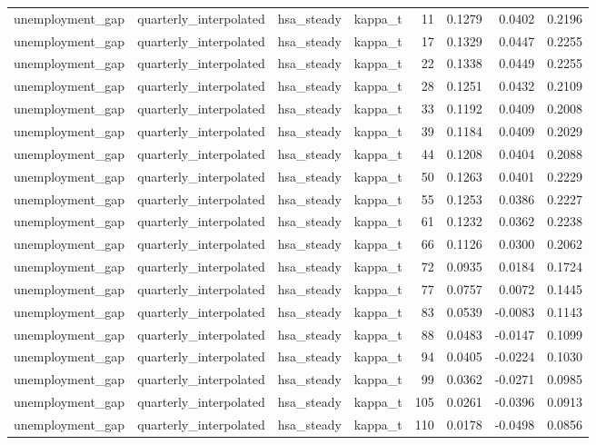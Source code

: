 \begin{tabular}{llllrrrr}
unemployment\_gap & quarterly\_interpolated & hsa\_steady & kappa\_t & 11 & 0.1279 & 0.0402 & 0.2196 \\
unemployment\_gap & quarterly\_interpolated & hsa\_steady & kappa\_t & 17 & 0.1329 & 0.0447 & 0.2255 \\
unemployment\_gap & quarterly\_interpolated & hsa\_steady & kappa\_t & 22 & 0.1338 & 0.0449 & 0.2255 \\
unemployment\_gap & quarterly\_interpolated & hsa\_steady & kappa\_t & 28 & 0.1251 & 0.0432 & 0.2109 \\
unemployment\_gap & quarterly\_interpolated & hsa\_steady & kappa\_t & 33 & 0.1192 & 0.0409 & 0.2008 \\
unemployment\_gap & quarterly\_interpolated & hsa\_steady & kappa\_t & 39 & 0.1184 & 0.0409 & 0.2029 \\
unemployment\_gap & quarterly\_interpolated & hsa\_steady & kappa\_t & 44 & 0.1208 & 0.0404 & 0.2088 \\
unemployment\_gap & quarterly\_interpolated & hsa\_steady & kappa\_t & 50 & 0.1263 & 0.0401 & 0.2229 \\
unemployment\_gap & quarterly\_interpolated & hsa\_steady & kappa\_t & 55 & 0.1253 & 0.0386 & 0.2227 \\
unemployment\_gap & quarterly\_interpolated & hsa\_steady & kappa\_t & 61 & 0.1232 & 0.0362 & 0.2238 \\
unemployment\_gap & quarterly\_interpolated & hsa\_steady & kappa\_t & 66 & 0.1126 & 0.0300 & 0.2062 \\
unemployment\_gap & quarterly\_interpolated & hsa\_steady & kappa\_t & 72 & 0.0935 & 0.0184 & 0.1724 \\
unemployment\_gap & quarterly\_interpolated & hsa\_steady & kappa\_t & 77 & 0.0757 & 0.0072 & 0.1445 \\
unemployment\_gap & quarterly\_interpolated & hsa\_steady & kappa\_t & 83 & 0.0539 & -0.0083 & 0.1143 \\
unemployment\_gap & quarterly\_interpolated & hsa\_steady & kappa\_t & 88 & 0.0483 & -0.0147 & 0.1099 \\
unemployment\_gap & quarterly\_interpolated & hsa\_steady & kappa\_t & 94 & 0.0405 & -0.0224 & 0.1030 \\
unemployment\_gap & quarterly\_interpolated & hsa\_steady & kappa\_t & 99 & 0.0362 & -0.0271 & 0.0985 \\
unemployment\_gap & quarterly\_interpolated & hsa\_steady & kappa\_t & 105 & 0.0261 & -0.0396 & 0.0913 \\
unemployment\_gap & quarterly\_interpolated & hsa\_steady & kappa\_t & 110 & 0.0178 & -0.0498 & 0.0856 \\

\end{tabular}
